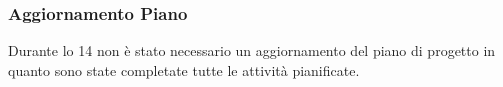\subsubsection{Aggiornamento Piano}
\label{sec:aggiornamento_piano_sprint14}
Durante lo  14 non è stato necessario un aggiornamento del piano di progetto in quanto sono state completate tutte le attività pianificate. 